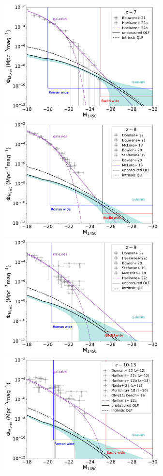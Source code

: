 \documentclass[twocolumn, twocolappendix]{aastex63}
\begin{document}
\begin{CJK*}{UTF8}{gbsn}
\begin{figure}
\centering
\includegraphics[width=85mm]{LF_spreadz7.pdf}\hspace{2mm}
\includegraphics[width=85mm]{LF_spreadz8.pdf}\\\vspace{5mm}
\includegraphics[width=85mm]{LF_spreadz9.pdf}\hspace{2mm}
\includegraphics[width=85mm]{LF_spreadz10.pdf}

\end{figure}
\end{CJK*}
\end{document}
